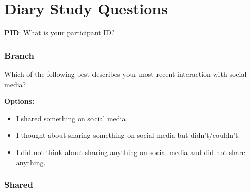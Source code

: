 \section{Diary Study Questions}
\label{ref:diary}

\textbf{PID}: What is your participant ID?

\subsubsection*{Branch}
Which of the following best describes your most recent interaction with social media?

\noindent\textbf{Options:}
\begin{itemize}
    \item I shared something on social media.
    \item I thought about sharing something on social media but didn't/couldn't.
    \item I did not think about sharing anything on social media and did not share anything.
\end{itemize}

\subsubsection*{Shared}

